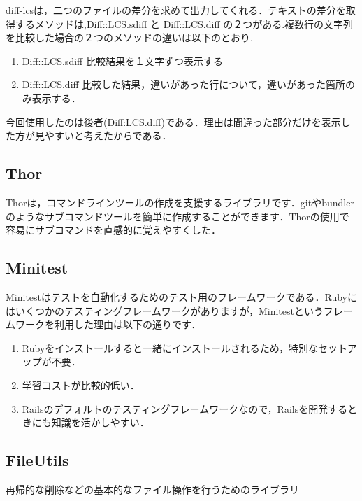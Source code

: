     diff-lcsは，二つのファイルの差分を求めて出力してくれる．テキストの差分を取得するメソッドは,Diff::LCS.sdiff
と Diff::LCS.diff
の２つがある.複数行の文字列を比較した場合の２つのメソッドの違いは以下のとおり.

\begin{enumerate}
\def\labelenumi{\arabic{enumi}.}
\tightlist
\item
  Diff::LCS.sdiff 比較結果を１文字ずつ表示する
\item
  Diff::LCS.diff
  比較した結果，違いがあった行について，違いがあった箇所のみ表示する．
\end{enumerate}

今回使用したのは後者(Diff:LCS.diff)である．理由は間違った部分だけを表示した方が見やすいと考えたからである．

    \subsection{Thor}\label{thor}

    Thorは，コマンドラインツールの作成を支援するライブラリです．gitやbundlerのようなサブコマンドツールを簡単に作成することができます．Thorの使用で容易にサブコマンドを直感的に覚えやすくした．

    \subsection{Minitest}\label{minitest}

    Minitestはテストを自動化するためのテスト用のフレームワークである．Rubyにはいくつかのテスティングフレームワークがありますが，Minitestというフレームワークを利用した理由は以下の通りです．

\begin{enumerate}
\def\labelenumi{\arabic{enumi}.}
\tightlist
\item
  Rubyをインストールすると一緒にインストールされるため，特別なセットアップが不要．
\item
  学習コストが比較的低い．
\item
  Railsのデフォルトのテスティングフレームワークなので，Railsを開発するときにも知識を活かしやすい．
\end{enumerate}

    \subsection{FileUtils}\label{fileutils}

    再帰的な削除などの基本的なファイル操作を行うためのライブラリ

